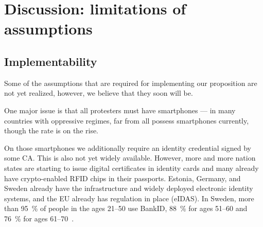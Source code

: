 \section{Discussion: limitations of assumptions}%
\label{Discussion}

\subsection{Implementability}

Some of the assumptions that are required for implementing our proposition are 
not yet realized, however, we believe that they soon will be.

One major issue is that all protesters must have smartphones --- in many 
countries with oppressive regimes, far from all possess smartphones
currently, though the rate is on the rise.

On those smartphones we additionally require an identity credential
signed by some \ac{CA}.  This is also not yet widely available.
However, more and more nation states are starting to issue digital
certificates in identity cards and many already have crypto-enabled
RFID chips in their passports.  \Eg Estonia, Germany, and Sweden
already have the infrastructure and widely deployed electronic
identity systems, and the EU already has regulation in place (eIDAS).
In Sweden, more than \SI{95}{\%} of people in the ages 21--50 use BankID, 
\SI{88}{\%} for ages 51--60 and \SI{76}{\%} for ages 
61--70~\cite{BankID-stats}.

